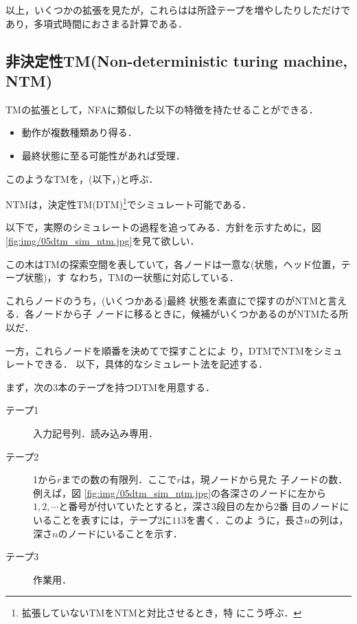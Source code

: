 以上，いくつかの拡張を見たが，これらはは所詮テープを増やしたりしただけで
あり，多項式時間におさまる計算である．

\subsection{非決定性TM(Non-deterministic turing machine, NTM)}
TMの拡張として，NFAに類似した以下の特徴を持たせることができる．
\begin{itemize}
 \item 動作が複数種類あり得る．
 \item 最終状態に至る可能性があれば受理．
\end{itemize}
このようなTMを，(以下，)と呼ぶ．

NTMは，決定性TM(DTM)\footnote{拡張していないTMをNTMと対比させるとき，特
にこう呼ぶ．}でシミュレート可能である．

以下で，実際のシミュレートの過程を追ってみる．方針を示すために，図
\ref{fig:img/05dtm_sim_ntm.jpg}を見て欲しい．


この木はTMの探索空間を表していて，各ノードは一意な(状態，ヘッド位置，テープ状態)，す
なわち，TMの一状態に対応している．

これらノードのうち，(いくつかある)最終
状態を素直にで探すのがNTMと言える．各ノードから子
ノードに移るときに，候補がいくつかあるのがNTMたる所以だ．

一方，これらノードを順番を決めてで探すことによ
り，DTMでNTMをシミュレートできる．
以下，具体的なシミュレート法を記述する．

まず，次の3本のテープを持つDTMを用意する．

\begin{description}
 \item[テープ1] 入力記号列．読み込み専用．
 \item[テープ2] 1から$r$までの数の有限列．ここで$r$は，現ノードから見た
            子ノードの数．例えば，図
            \ref{fig:img/05dtm_sim_ntm.jpg}の各深さのノードに左から
            $1,2,\cdots$と番号が付いていたとすると，深さ3段目の左から2番
            目のノードにいることを表すには，テープ2に$113$を書く．このよ
            うに，長さ$n$の列は，深さ$n$のノードにいることを示す．
 \item[テープ3] 作業用．
\end{description}

